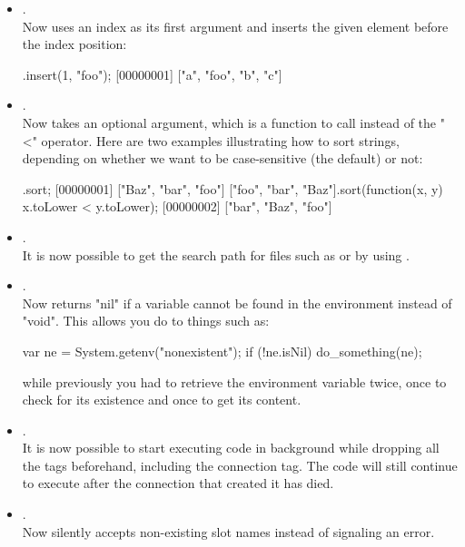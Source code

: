 \begin{itemize}
\item {}.\\
  Now uses an index as its first argument and inserts the given element
  before the index position:

\begin{urbiscript}
["a", "b", "c"].insert(1, "foo");
[00000001] ["a", "foo", "b", "c"]
\end{urbiscript}

\item {}.\\
  Now takes an optional argument, which is a function to call instead of the
  "<" operator. Here are two examples illustrating how to sort strings,
  depending on whether we want to be case-sensitive (the default) or not:

\begin{urbiscript}
.sort;
[00000001] ["Baz", "bar", "foo"]
["foo", "bar", "Baz"].sort(function(x, y) {x.toLower < y.toLower});
[00000002] ["bar", "Baz", "foo"]
\end{urbiscript}

\item {}.\\
  It is now possible to get the search path for files such as 
  or  by using .

\item {}.\\
  Now returns "nil" if a variable cannot be found in the environment instead
  of "void". This allows you do to things such as:

\begin{urbiscript}
var ne = System.getenv("nonexistent");
if (!ne.isNil) do_something(ne);
\end{urbiscript}

  \noindent
  while previously you had to retrieve the environment variable twice, once
  to check for its existence and once to get its content.

\item {}.\\
  It is now possible to start executing code in background while dropping
  all the tags beforehand, including the connection tag. The code will still
  continue to execute after the connection that created it has died.

\item {}.\\
  Now silently accepts non-existing slot names instead of signaling an
  error.


\end{itemize}
